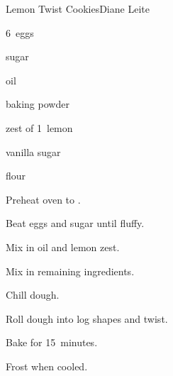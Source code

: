 \begin{recipe}{Lemon Twist Cookies}{Diane Leite}{}

\begin{ingredients}
\item 6~eggs
\item {} sugar
\item {} oil
\item {} baking powder
\item zest of 1~lemon
\item {} vanilla sugar
\item {} flour
\end{ingredients}

\begin{directions}
\item Preheat oven to .
\item Beat eggs and sugar until fluffy.
\item Mix in oil and lemon zest.
\item Mix in remaining ingredients.
\item Chill dough.
\item Roll dough into log shapes and twist.
\item Bake for 15~minutes.
\item Frost when cooled.
\end{directions}
\end{recipe}
